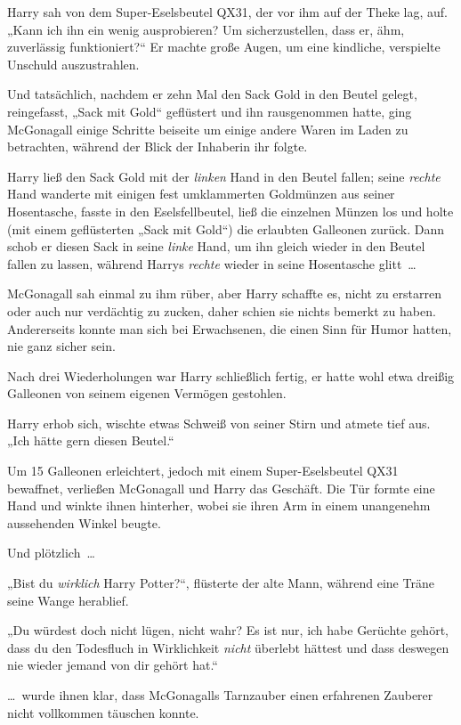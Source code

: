 {Harry sah von dem Super-Eselsbeutel QX31, der vor ihm auf der Theke lag, auf. „Kann ich ihn ein wenig ausprobieren? Um sicherzustellen, dass er, ähm, zuverlässig funktioniert?“ Er machte große Augen, um eine kindliche, verspielte Unschuld auszustrahlen.

Und tatsächlich, nachdem er zehn Mal den Sack Gold in den Beutel gelegt, reingefasst, „Sack mit Gold“ geflüstert und ihn rausgenommen hatte, ging McGonagall einige Schritte beiseite um einige andere Waren im Laden zu betrachten, während der Blick der Inhaberin ihr folgte.

Harry ließ den Sack Gold mit der \emph{linken} Hand in den Beutel fallen; seine \emph{rechte} Hand wanderte mit einigen fest umklammerten Goldmünzen aus seiner Hosentasche, fasste in den Eselsfellbeutel, ließ die einzelnen Münzen los und holte (mit einem geflüsterten „Sack mit Gold“) die erlaubten Galleonen zurück. Dann schob er diesen Sack in seine \emph{linke} Hand, um ihn gleich wieder in den Beutel fallen zu lassen, während Harrys \emph{rechte} wieder in seine Hosentasche glitt~…

McGonagall sah einmal zu ihm rüber, aber Harry schaffte es, nicht zu erstarren oder auch nur verdächtig zu zucken, daher schien sie nichts bemerkt zu haben. Andererseits konnte man sich bei Erwachsenen, die einen Sinn für Humor hatten, nie ganz sicher sein.

Nach drei Wiederholungen war Harry schließlich fertig, er hatte wohl etwa dreißig Galleonen von seinem eigenen Vermögen gestohlen.

Harry erhob sich, wischte etwas Schweiß von seiner Stirn und atmete tief aus. „Ich hätte gern diesen Beutel.“

Um 15 Galleonen erleichtert, jedoch mit einem Super-Eselsbeutel QX31 bewaffnet, verließen McGonagall und Harry das Geschäft. Die Tür formte eine Hand und winkte ihnen hinterher, wobei sie ihren Arm in einem unangenehm aussehenden Winkel beugte.

Und plötzlich~…

„Bist du \emph{wirklich} Harry Potter?“, flüsterte der alte Mann, während eine Träne seine Wange herablief.

„Du würdest doch nicht lügen, nicht wahr? Es ist nur, ich habe Gerüchte gehört, dass du den Todesfluch in Wirklichkeit \emph{nicht} überlebt hättest und dass deswegen nie wieder jemand von dir gehört hat.“

…~wurde ihnen klar, dass McGonagalls Tarnzauber einen erfahrenen Zauberer nicht vollkommen täuschen konnte.

}
